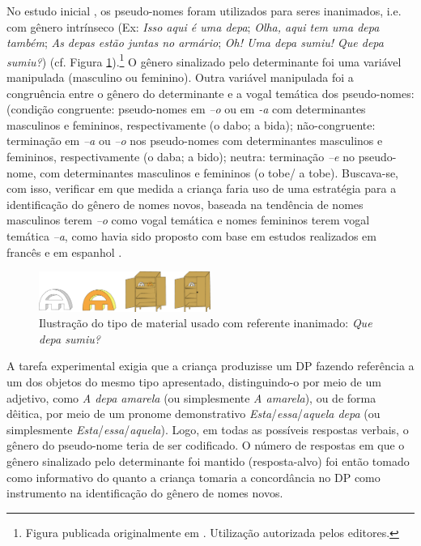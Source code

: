 \documentclass[output=paper]{LSP/langsci}
\begin{document}
No estudo inicial \citep{correaname2003}, os pseudo-nomes foram utilizados para seres inanimados, i.e. com gênero intrínseco (Ex: \textit{Isso aqui é uma depa}; \textit{Olha, aqui tem uma depa também}; \textit{As depas estão juntas no armário}; \textit{Oh! Uma depa sumiu! Que depa sumiu?}) (cf. Figura \ref{fig:correanp_1}).\footnote{Figura publicada originalmente em \citet{correaname2003}. Utilização autorizada pelos editores.} O gênero sinalizado pelo determinante foi uma variável manipulada (masculino ou feminino). Outra variável manipulada foi a congruência entre o gênero do determinante e a vogal temática dos pseudo-nomes: (condição congruente: pseudo-nomes em \textit{–o} ou em \textit{-a} com determinantes masculinos e femininos, respectivamente (o dabo; a bida); não-congruente: terminação em \textit{–a} ou \textit{–o} nos pseudo-nomes com determinantes masculinos e femininos, respectivamente (o daba; a bido); neutra: terminação \textit{–e} no pseudo-nome, com determinantes masculinos e femininos (o tobe/ a tobe). Buscava-se, com isso, verificar em que medida a criança faria uso de uma estratégia para a identificação do gênero de nomes novos, baseada na tendência de nomes masculinos terem \textit{–o} como vogal temática e nomes femininos terem vogal temática \textit{–a}, como havia sido proposto com base em estudos realizados em francês e em espanhol \citep{karmiloffsmith1979,perezpereira1991}.

\begin{figure}
\includegraphics[width=0.5\textwidth]{figures/correanp1}
\caption{Ilustração do tipo de material usado com referente inanimado: \textit{Que depa sumiu?}}
\label{fig:correanp_1}
\end{figure}

A tarefa experimental exigia que a criança produzisse um DP fazendo referência a um dos objetos do mesmo tipo apresentado, distinguindo-o por meio de um adjetivo, como \textit{A depa amarela} (ou simplesmente \textit{A amarela}), ou de forma dêitica, por meio de um pronome demonstrativo  \textit{Esta}/\textit{essa}/\textit{aquela depa} (ou simplesmente \textit{Esta}/\textit{essa}/\textit{aquela}). Logo, em todas as possíveis respostas verbais, o gênero do pseudo-nome teria de ser codificado. O número de respostas em que o gênero sinalizado pelo determinante foi mantido (resposta-alvo) foi então tomado como informativo do quanto a criança tomaria a concordância no DP como instrumento na identificação do gênero de nomes novos.
\end{document}
